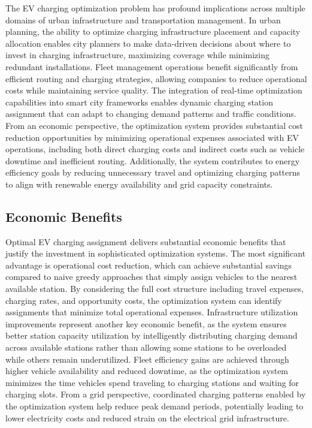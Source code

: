 \documentclass[12pt,a4paper]{article}
\begin{document}
The EV charging optimization problem has profound implications across multiple domains of urban infrastructure and transportation management. In urban planning, the ability to optimize charging infrastructure placement and capacity allocation enables city planners to make data-driven decisions about where to invest in charging infrastructure, maximizing coverage while minimizing redundant installations. Fleet management operations benefit significantly from efficient routing and charging strategies, allowing companies to reduce operational costs while maintaining service quality. The integration of real-time optimization capabilities into smart city frameworks enables dynamic charging station assignment that can adapt to changing demand patterns and traffic conditions. From an economic perspective, the optimization system provides substantial cost reduction opportunities by minimizing operational expenses associated with EV operations, including both direct charging costs and indirect costs such as vehicle downtime and inefficient routing. Additionally, the system contributes to energy efficiency goals by reducing unnecessary travel and optimizing charging patterns to align with renewable energy availability and grid capacity constraints.

\subsection{Economic Benefits}

Optimal EV charging assignment delivers substantial economic benefits that justify the investment in sophisticated optimization systems. The most significant advantage is operational cost reduction, which can achieve substantial savings compared to naive greedy approaches that simply assign vehicles to the nearest available station. By considering the full cost structure including travel expenses, charging rates, and opportunity costs, the optimization system can identify assignments that minimize total operational expenses. Infrastructure utilization improvements represent another key economic benefit, as the system ensures better station capacity utilization by intelligently distributing charging demand across available stations rather than allowing some stations to be overloaded while others remain underutilized. Fleet efficiency gains are achieved through higher vehicle availability and reduced downtime, as the optimization system minimizes the time vehicles spend traveling to charging stations and waiting for charging slots. From a grid perspective, coordinated charging patterns enabled by the optimization system help reduce peak demand periods, potentially leading to lower electricity costs and reduced strain on the electrical grid infrastructure.
\end{document}
